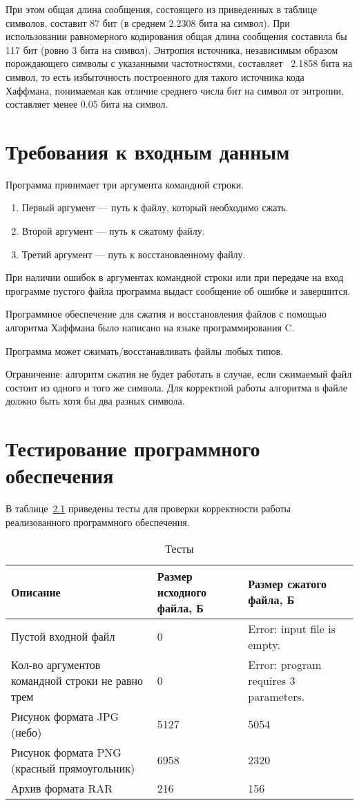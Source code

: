 \documentclass{bmstu}
\begin{document}
При этом общая длина сообщения, состоящего из приведенных в таблице символов, составит 87 бит (в среднем 2.2308 бита на символ). 
При использовании равномерного кодирования общая длина сообщения составила бы 117 бит (ровно 3 бита на символ). 
Энтропия источника, независимым образом порождающего символы с указанными частотностями, составляет ~2.1858 бита на символ, то есть избыточность построенного для такого источника кода Хаффмана, понимаемая как отличие среднего числа бит на символ от энтропии, составляет менее 0.05 бита на символ.

\chapter{Требования к входным данным}

Программа принимает три аргумента командной строки.
\begin{enumerate}
\item Первый аргумент --- путь к файлу, который необходимо сжать. 
\item Второй аргумент --- путь к сжатому файлу. 
\item Третий аргумент --- путь к восстановленному файлу.
\end{enumerate}

При наличии ошибок в аргументах командной строки или при передаче на вход программе пустого файла программа выдаст сообщение об ошибке и завершится.

Программное обеспечение для сжатия и восстановления файлов с помощью алгоритма Хаффмана было написано на языке программирования C.

Программа может сжимать/восстанавливать файлы любых типов.

Ограничение: алгоритм сжатия не будет работать в случае, если сжимаемый файл состоит из одного и того же символа. 
Для корректной работы алгоритма в файле должно быть хотя бы два разных символа.

\chapter{Тестирование программного обеспечения}

В таблице~\ref{tabular:tests} приведены тесты для проверки корректности работы реализованного программного обеспечения.

\begin{table}[H]
\caption{Тесты}
\label{tabular:tests}
\begin{tabular}{|p{4cm}|p{5cm}|p{6cm}|}
\hline
\textbf{Описание} & \textbf{Размер исходного файла, Б} & \textbf{Размер сжатого файла, Б}
\tabularnewline
\hline
Пустой входной файл & 0 & Error: input file is empty.
\tabularnewline
\hline
Кол-во аргументов командной строки не равно трем & 0 & Error: program requires 3 parameters.
\tabularnewline
\hline
Рисунок формата JPG (небо) & 5127 & 5054
\tabularnewline
\hline
Рисунок формата PNG (красный прямоугольник) & 6958 & 2320
\tabularnewline
\hline
Архив формата RAR & 216 & 156
\tabularnewline
\hline
\end{tabular}
\end{table}
\end{document}
